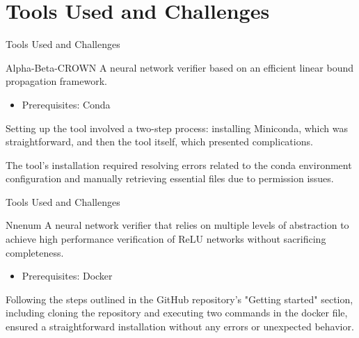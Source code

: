 \documentclass[9pt]{beamer}
\begin{document}
\section{Tools Used and Challenges}
\begin{frame}{Tools Used and Challenges}

\begin{block}{Alpha-Beta-CROWN}
\vspace{0.1cm}
  A neural network verifier based on an efficient linear bound propagation framework.
\end{block}
  
\begin{itemize}
    \item Prerequisites: Conda
    \vspace{0.2cm}
\end{itemize}


Setting up the tool involved a two-step process: installing Miniconda, which was straightforward, and then the tool itself, which presented complications. 

\vspace{0.15cm}

The tool's installation required resolving errors related to the conda environment configuration and manually retrieving essential files due to permission issues.
\end{frame}

\begin{frame}{Tools Used and Challenges}

\begin{block}{Nnenum}
\vspace{0.1cm}
  A neural network verifier that relies on multiple levels of abstraction to achieve high performance verification of ReLU networks without sacrificing completeness.
\end{block}

\begin{itemize}
    \item Prerequisites: Docker
    \vspace{0.2cm}

\end{itemize}

Following the steps outlined in the GitHub repository's "Getting started" section, including cloning the repository and executing two commands in the docker file, ensured a straightforward installation without any errors or unexpected behavior.

\end{frame}
\end{document}
